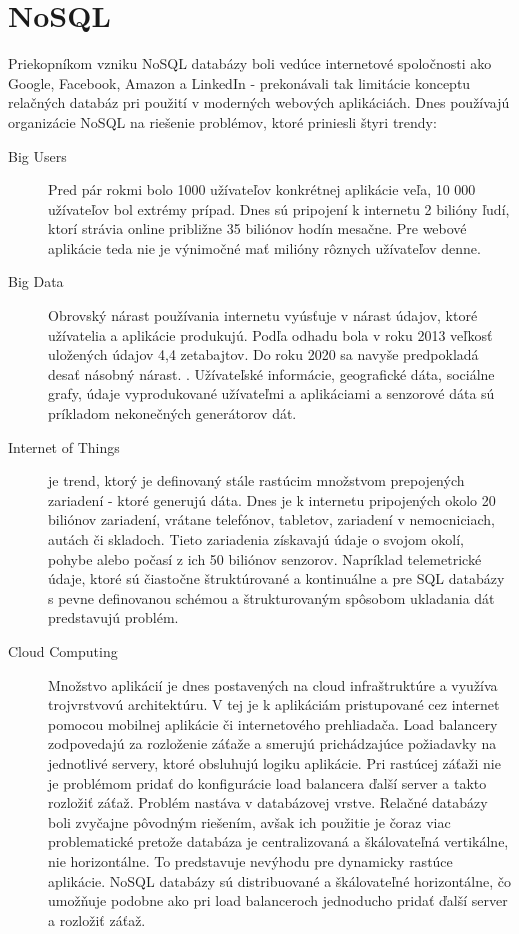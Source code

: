 \section{NoSQL}
	Priekopníkom vzniku NoSQL databázy boli vedúce internetové spoločnosti ako Google, Facebook, Amazon a LinkedIn - prekonávali tak limitácie konceptu relačných databáz pri použití v moderných webových aplikáciách. Dnes používajú organizácie NoSQL na riešenie problémov, ktoré priniesli štyri trendy: \cite{nosql}
	\begin{description}
		\item[Big Users] Pred pár rokmi bolo 1000 užívateľov konkrétnej aplikácie veľa, 10 000 užívateľov bol extrémy prípad. Dnes sú pripojení k internetu 2 bilióny ľudí, ktorí strávia online približne 35 biliónov hodín mesačne. Pre webové aplikácie teda nie je výnimočné mať milióny rôznych užívateľov denne.
		
		\item[Big Data] Obrovský nárast používania internetu vyúsťuje v nárast údajov, ktoré užívatelia a aplikácie produkujú. Podľa odhadu bola v roku 2013 veľkosť uložených údajov 4,4 zetabajtov. Do roku 2020 sa navyše predpokladá desať násobný nárast. \cite{web:idc-bigdata}. Užívateľské informácie, geografické dáta, sociálne grafy, údaje vyprodukované užívateľmi a aplikáciami a senzorové dáta sú príkladom nekonečných generátorov dát.
		
		\item[Internet of Things] je trend, ktorý je definovaný stále rastúcim množstvom prepojených zariadení - ktoré generujú dáta. Dnes je k internetu pripojených okolo 20 biliónov zariadení, vrátane telefónov, tabletov, zariadení v nemocniciach, autách či skladoch. Tieto zariadenia získavajú údaje o svojom okolí, pohybe alebo počasí z ich 50 biliónov senzorov. \cite{nosql}
		Napríklad telemetrické údaje, ktoré sú čiastočne štruktúrované a kontinuálne a pre SQL databázy s pevne definovanou schémou a štrukturovaným spôsobom ukladania dát predstavujú problém.
		
		\item[Cloud Computing] Množstvo aplikácií je dnes postavených na cloud infraštruktúre a využíva trojvrstvovú architektúru. V tej je k aplikáciám pristupované cez internet pomocou mobilnej aplikácie či internetového prehliadača. Load balancery zodpovedajú za rozloženie záťaže a smerujú prichádzajúce požiadavky na jednotlivé servery, ktoré obsluhujú logiku aplikácie. Pri rastúcej záťaži nie je problémom pridať do konfigurácie load balancera ďalší server a takto rozložiť záťaž.
		Problém nastáva v databázovej vrstve. Relačné databázy boli zvyčajne pôvodným riešením, avšak ich použitie je čoraz viac problematické pretože databáza je centralizovaná a škálovateľná vertikálne, nie horizontálne. To predstavuje nevýhodu pre dynamicky rastúce aplikácie. NoSQL databázy sú distribuované a škálovateľné horizontálne, čo umožňuje podobne ako pri load balanceroch jednoducho pridať ďalší server a rozložiť záťaž.
	\end{description}
	
